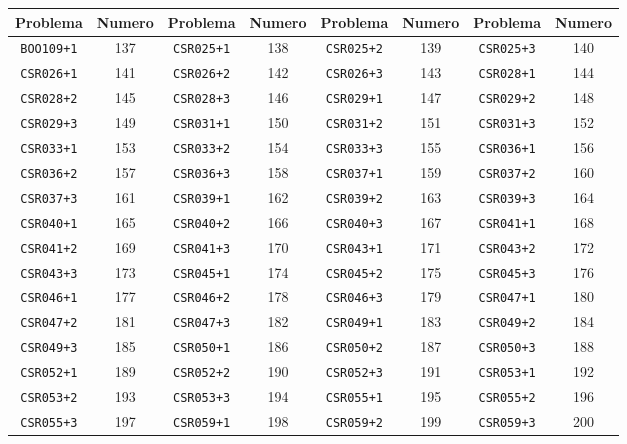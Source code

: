 \documentclass[./main.tex]{subfiles}
\begin{document}
\begin{table}[H]
\begin{tabular}{|c|c|c|c|c|c|c|c|}
\hline
Problema & Numero & Problema & Numero & Problema & Numero & Problema & Numero \\
\hline
\texttt{BOO109+1} & 137 & \texttt{CSR025+1} & 138 & \texttt{CSR025+2} & 139 & \texttt{CSR025+3} & 140\\
\hline
\texttt{CSR026+1} & 141 & \texttt{CSR026+2} & 142 & \texttt{CSR026+3} & 143 & \texttt{CSR028+1} & 144\\
\hline
\texttt{CSR028+2} & 145 & \texttt{CSR028+3} & 146 & \texttt{CSR029+1} & 147 & \texttt{CSR029+2} & 148\\
\hline
\texttt{CSR029+3} & 149 & \texttt{CSR031+1} & 150 & \texttt{CSR031+2} & 151 & \texttt{CSR031+3} & 152\\
\hline
\texttt{CSR033+1} & 153 & \texttt{CSR033+2} & 154 & \texttt{CSR033+3} & 155 & \texttt{CSR036+1} & 156\\
\hline
\texttt{CSR036+2} & 157 & \texttt{CSR036+3} & 158 & \texttt{CSR037+1} & 159 & \texttt{CSR037+2} & 160\\
\hline
\texttt{CSR037+3} & 161 & \texttt{CSR039+1} & 162 & \texttt{CSR039+2} & 163 & \texttt{CSR039+3} & 164\\
\hline
\texttt{CSR040+1} & 165 & \texttt{CSR040+2} & 166 & \texttt{CSR040+3} & 167 & \texttt{CSR041+1} & 168\\
\hline
\texttt{CSR041+2} & 169 & \texttt{CSR041+3} & 170 & \texttt{CSR043+1} & 171 & \texttt{CSR043+2} & 172\\
\hline
\texttt{CSR043+3} & 173 & \texttt{CSR045+1} & 174 & \texttt{CSR045+2} & 175 & \texttt{CSR045+3} & 176\\
\hline
\texttt{CSR046+1} & 177 & \texttt{CSR046+2} & 178 & \texttt{CSR046+3} & 179 & \texttt{CSR047+1} & 180\\
\hline
\texttt{CSR047+2} & 181 & \texttt{CSR047+3} & 182 & \texttt{CSR049+1} & 183 & \texttt{CSR049+2} & 184\\
\hline
\texttt{CSR049+3} & 185 & \texttt{CSR050+1} & 186 & \texttt{CSR050+2} & 187 & \texttt{CSR050+3} & 188\\
\hline
\texttt{CSR052+1} & 189 & \texttt{CSR052+2} & 190 & \texttt{CSR052+3} & 191 & \texttt{CSR053+1} & 192\\
\hline
\texttt{CSR053+2} & 193 & \texttt{CSR053+3} & 194 & \texttt{CSR055+1} & 195 & \texttt{CSR055+2} & 196\\
\hline
\texttt{CSR055+3} & 197 & \texttt{CSR059+1} & 198 & \texttt{CSR059+2} & 199 & \texttt{CSR059+3} & 200\\

\end{tabular}
\end{table}
\end{document}
